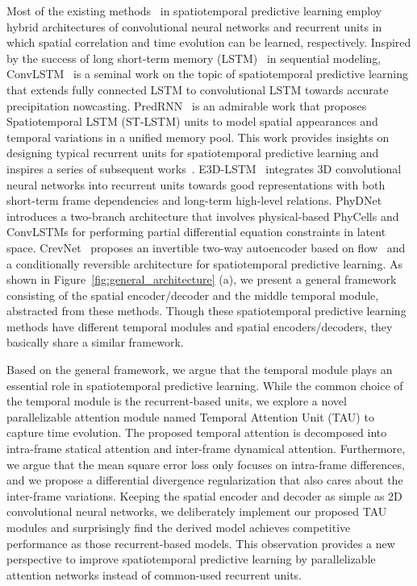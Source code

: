 \documentclass[10pt,twocolumn,letterpaper]{article}
\begin{document}
Most of the existing methods~\cite{convlstm,predrnn,predrnn++,e3dlstm,mim,phydnet,predrnnv2,crevnet, finn2016unsupervised,shi2017deep,su2020convolutional,kalchbrenner2017video,bhagat2020disentangling,wu2021motionrnn,gehring2017convolutional,villegas2018hierarchical,villegas2019high,minderer2019unsupervised,denton2018stochastic,denton2017unsupervised,cheng2021graph,babaeizadeh2021fitvid,jin2020exploring} in spatiotemporal predictive learning employ hybrid architectures of convolutional neural networks and recurrent units in which spatial correlation and time evolution can be learned, respectively. Inspired by the success of long short-term memory (LSTM)~\cite{hochreiter1997long} in sequential modeling, ConvLSTM~\cite{convlstm} is a seminal work on the topic of spatiotemporal predictive learning that extends fully connected LSTM to convolutional LSTM towards accurate precipitation nowcasting. PredRNN~\cite{predrnn} is an admirable work that proposes Spatiotemporal LSTM (ST-LSTM) units to model spatial appearances and temporal variations in a unified memory pool. This work provides insights on designing typical recurrent units for spatiotemporal predictive learning and inspires a series of subsequent works~\cite{predrnn++, byeon2018contextvp, mim, predrnnv2}. E3D-LSTM~\cite{e3dlstm} integrates 3D convolutional neural networks into recurrent units towards good representations with both short-term frame dependencies and long-term high-level relations. PhyDNet~\cite{phydnet} introduces a two-branch architecture that involves physical-based PhyCells and ConvLSTMs for performing partial differential equation constraints in latent space. CrevNet~\cite{crevnet} proposes an invertible two-way autoencoder based on flow~\cite{dinh2014nice,dinh2016density_realnvp} and a conditionally reversible architecture for spatiotemporal predictive learning. As shown in Figure~\ref{fig:general_architecture} (a), we present a general framework consisting of the spatial encoder/decoder and the middle temporal module, abstracted from these methods. Though these spatiotemporal predictive learning methods have different temporal modules and spatial encoders/decoders, they basically share a similar framework.

Based on the general framework, we argue that the temporal module plays an essential role in spatiotemporal predictive learning. While the common choice of the temporal module is the recurrent-based units, we explore a novel parallelizable attention module named Temporal Attention Unit (TAU) to capture time evolution. The proposed temporal attention is decomposed into intra-frame statical attention and inter-frame dynamical attention. Furthermore, we argue that the mean square error loss only focuses on intra-frame differences, and we propose a differential divergence regularization that also cares about the inter-frame variations. Keeping the spatial encoder and decoder as simple as 2D convolutional neural networks, we deliberately implement our proposed TAU modules and surprisingly find the derived model achieves competitive performance as those recurrent-based models. This observation provides a new perspective to improve spatiotemporal predictive learning by parallelizable attention networks instead of common-used recurrent units. 
\end{document}
